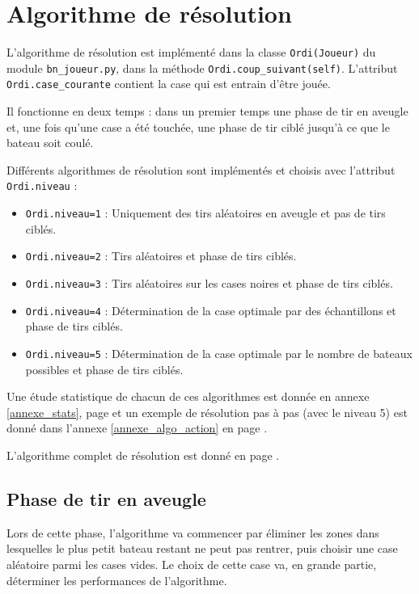 \chapter{Algorithme de résolution}





L'algorithme de résolution est implémenté dans la classe \texttt{Ordi(Joueur)} du module \texttt{bn\_joueur.py}, dans la méthode \texttt{Ordi.coup\_suivant(self)}. L'attribut \texttt{Ordi.case\_courante} contient la case qui est entrain d'être jouée.

Il fonctionne en deux temps : dans un premier temps une phase de tir en aveugle et, une fois qu'une case a été touchée, une phase de tir ciblé jusqu'à ce que le bateau soit coulé.

Différents algorithmes de résolution sont implémentés et choisis avec l'attribut \texttt{Ordi.niveau} :
\begin{itemize}
\item \texttt{Ordi.niveau=1} : Uniquement des tirs aléatoires en aveugle et pas de tirs ciblés.
\item \texttt{Ordi.niveau=2} : Tirs aléatoires et phase de tirs ciblés.
\item \texttt{Ordi.niveau=3} : Tirs aléatoires sur les cases noires  et phase de tirs ciblés.
\item \texttt{Ordi.niveau=4} : Détermination de la case optimale par des échantillons et phase de tirs ciblés.
\item \texttt{Ordi.niveau=5} : Détermination de la case optimale par le nombre de bateaux possibles et phase de tirs ciblés.
\end{itemize}

Une étude statistique de chacun de ces algorithmes est donnée en annexe \ref{annexe_stats}, page \pageref{annexe_stats} et un exemple de résolution pas à pas (avec le niveau 5) est donné dans l'annexe \ref{annexe_algo_action} en page \pageref{annexe_algo_action}.

L'algorithme complet de résolution est donné en page \pageref{algo_resolution}.




\section{Phase de tir en aveugle}
Lors de cette phase, l'algorithme va commencer par éliminer les zones dans lesquelles le plus petit bateau restant ne peut pas rentrer, puis choisir une case aléatoire parmi les cases vides. Le choix de cette case va, en grande partie, déterminer les performances de l'algorithme.

